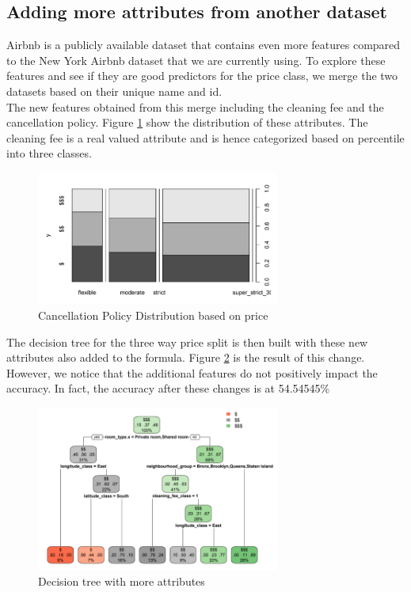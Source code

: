 \documentclass{sig-alternate}
\begin{document}
	\subsection{Adding more attributes from another dataset}
	Airbnb is a publicly available dataset that contains even more features compared to the New York Airbnb dataset that we are currently using. To explore these features and see if they are good predictors for the price class, we merge the two datasets based on their unique name and id. \\
	The new features obtained from this merge including the cleaning fee and the cancellation policy. Figure \ref{cancellation} show the distribution of these attributes. 
	The cleaning fee is a real valued attribute and is hence categorized based on percentile into three classes.\\
\begin{figure}[ht]
	\includegraphics[width=8cm]{cancellation.PNG}
	\caption{Cancellation Policy Distribution based on price}
	\label{cancellation}
	\centering
\end{figure}
	The decision tree for the three way price split is then built with these new attributes also added to the formula. Figure \ref{decision5} is the result of this change.\\
	However, we notice that the additional features do not positively impact the accuracy. In fact, the accuracy after these changes is at 54.54545\%
	\begin{figure}[ht]
		\includegraphics[width=8cm]{decision5.PNG}
		\caption{Decision tree with more attributes}
		\label{decision5}
		\centering
	\end{figure}
\end{document}
